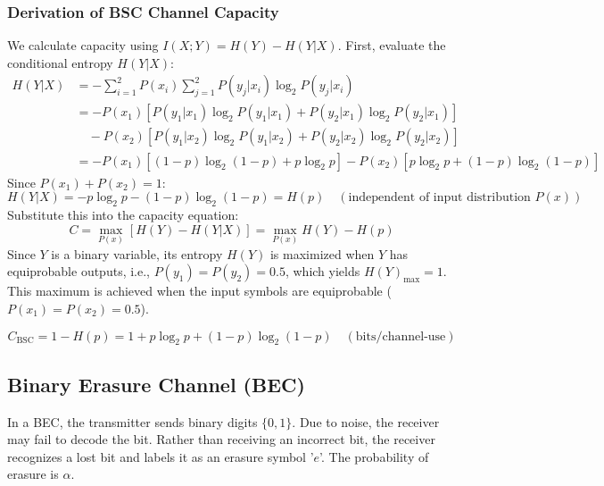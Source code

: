 \documentclass[12pt,a4paper]{article}
\begin{document}
\subsubsection{Derivation of BSC Channel Capacity}
We calculate capacity using $I(X; Y) = H(Y) - H(Y|X)$.
First, evaluate the conditional entropy $H(Y|X)$:
\begin{align*}
  H(Y|X) &= -\sum_{i=1}^2 P(x_i) \sum_{j=1}^2 P(y_j|x_i) \log_2 P(y_j|x_i) \\
  &= -P(x_1) \left[ P(y_1|x_1)\log_2 P(y_1|x_1) + P(y_2|x_1)\log_2 P(y_2|x_1) \right] \\
  &\quad - P(x_2) \left[ P(y_1|x_2)\log_2 P(y_1|x_2) + P(y_2|x_2)\log_2 P(y_2|x_2) \right] \\
  &= -P(x_1) \left[ (1-p)\log_2(1-p) + p\log_2 p \right] - P(x_2) \left[ p\log_2 p + (1-p)\log_2(1-p) \right]
\end{align*}
Since $P(x_1) + P(x_2) = 1$:
\begin{equation*}
  H(Y|X) = -p\log_2 p - (1-p)\log_2(1-p) = H(p) \quad (\text{independent of input distribution } P(x))
\end{equation*}
Substitute this into the capacity equation:
\begin{equation*}
  C = \max_{P(x)} \left[ H(Y) - H(Y|X) \right] = \max_{P(x)} H(Y) - H(p)
\end{equation*}
Since $Y$ is a binary variable, its entropy $H(Y)$ is maximized when $Y$ has equiprobable outputs, i.e., $P(y_1) = P(y_2) = 0.5$, which yields $H(Y)_{\text{max}} = 1$. This maximum is achieved when the input symbols are equiprobable ($P(x_1) = P(x_2) = 0.5$).
\begin{tcolorbox}[formulabox, title={\textbf{BSC Channel Capacity}}]
\begin{equation}
  C_{\text{BSC}} = 1 - H(p) = 1 + p\log_2 p + (1-p)\log_2(1-p) \quad (\text{bits/channel-use})
\end{equation}
\end{tcolorbox}

\subsection{Binary Erasure Channel (BEC)}
In a BEC, the transmitter sends binary digits $\{0, 1\}$. Due to noise, the receiver may fail to decode the bit. Rather than receiving an incorrect bit, the receiver recognizes a lost bit and labels it as an erasure symbol '$e$'. The probability of erasure is $\alpha$.
\end{document}
